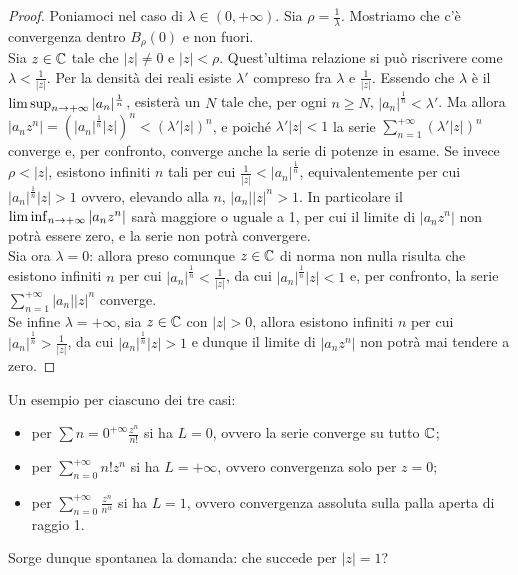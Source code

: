 \documentclass[Completo.tex]{subfiles}
\begin{document}
\begin{proof}
	Poniamoci nel caso di $\lambda \in (0, +\infty)$. Sia $\rho = \frac{1}{\lambda}$. Mostriamo che c'è convergenza dentro $B_{\rho}(0)$ e non fuori. \\
	Sia $z \in \bb[C]$ tale che $\vert z \vert \neq 0$ e $\vert z \vert < \rho$. Quest'ultima relazione si può riscrivere come $\lambda < \frac{1}{\vert z \vert}$. Per la densità dei reali esiste $\lambda'$ compreso fra $\lambda$ e $\frac{1}{\vert z \vert}$. Essendo che $\lambda$ è il $\limsup_{n \rightarrow +\infty} \vert a_n \vert^{\frac{1}{n}}$, esisterà un $N$ tale che, per ogni $n \geq N$, $\vert a_n \vert^{\frac{1}{n}} < \lambda'$. Ma allora $\vert a_n z^n \vert = (\vert a_n \vert^{\frac{1}{n}} \vert z \vert)^n < (\lambda' \vert z \vert)^n$, e poiché $\lambda' \vert z \vert < 1$ la serie $\sum_{n = 1}^{+\infty} (\lambda' \vert z \vert)^n$ converge e, per confronto, converge anche la serie di potenze in esame. Se invece $\rho < \vert z \vert$, esistono infiniti $n$ tali per cui $\frac{1}{\vert z \vert} < \vert a_n \vert^{\frac{1}{n}}$, equivalentemente per cui $\vert a_n \vert^{\frac{1}{n}} \vert z \vert > 1$ ovvero, elevando alla $n$, $\vert a_n \vert \vert z \vert^n > 1$. In particolare il $\liminf_{n \rightarrow +\infty} \vert a_n z^n \vert$ sarà maggiore o uguale a 1, per cui il limite di $\vert a_n z^n \vert$ non potrà essere zero, e la serie non potrà convergere. \\
	Sia ora $\lambda = 0$: allora preso comunque $z \in \bb[C]$ di norma non nulla risulta che esistono infiniti $n$ per cui $\vert a_n \vert^{\frac{1}{n}} < \frac{1}{\vert z \vert}$, da cui $\vert a_n \vert^{\frac{1}{n}} \vert z \vert < 1$ e, per confronto, la serie $\sum_{n=1}^{+\infty} \vert a_n \vert \vert z \vert^{n}$ converge. \\
	Se infine $\lambda = +\infty$, sia $z \in \bb[C]$ con $\vert z \vert > 0$, allora esistono infiniti $n$ per cui $\vert a_n \vert^{\frac{1}{n}} > \frac{1}{\vert z \vert}$, da cui $\vert a_n \vert^{\frac{1}{n}} \vert z \vert > 1$ e dunque il limite di $\vert a_n z^n \vert$ non potrà mai tendere a zero.
\end{proof}
\begin{Ex} Un esempio per ciascuno dei tre casi:
	\begin{itemize}
		\item per $\sum{n=0}^{+\infty} \frac{z^n}{n!}$ si ha $L = 0$, ovvero la serie converge su tutto $\bb[C]$;
		\item per $\sum_{n=0}^{+\infty} n! z^n$ si ha $L = +\infty$, ovvero convergenza solo per $z = 0$;
		\item per $\sum_{n=0}^{+\infty} \frac{z^n}{n^{\alpha}}$ si ha $L = 1$, ovvero convergenza assoluta sulla palla aperta di raggio 1. 
	\end{itemize}
Sorge dunque spontanea la domanda: che succede per $\vert z \vert = 1$?
\end{Ex}
\end{document}
